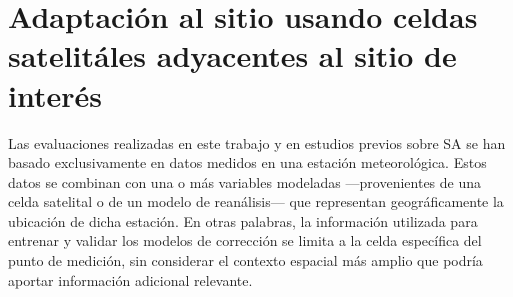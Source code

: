 \begin{table}
\caption{Métricas de desempeño (MBE, MAE, RMSE) para cada modelo en el conjunto de prubeas de los cinco sitios. Los valores están normalizados y expresados como porcentajes relativos a la media de GHI en cada sitio: 429.2~W/m$^2$ (Yu), 432.9~W/m$^2$ (Sa), 554.4~W/m$^2$ (Sca), 628.4~W/m$^2$ (Ero), y 648.7~W/m$^2$ (Lq). Los modelos etiquetados con ``(1 var.)'' indican adaptación al sitio realizada utilizando solo un regresor (CAMS o LSA-SAF).}
\label{tab:metricas_4_1}
\centering
{}
\end{table}





\section{Adaptación al sitio usando celdas satelitáles adyacentes al sitio de interés}
Las evaluaciones realizadas en este trabajo y en estudios previos sobre SA se han basado exclusivamente en datos medidos en una estación meteorológica. Estos datos se combinan con una o más variables modeladas —provenientes de una celda satelital o de un modelo de reanálisis— que representan geográficamente la ubicación de dicha estación. En otras palabras, la información utilizada para entrenar y validar los modelos de corrección se limita a la celda específica del punto de medición, sin considerar el contexto espacial más amplio que podría aportar información adicional relevante.\\

